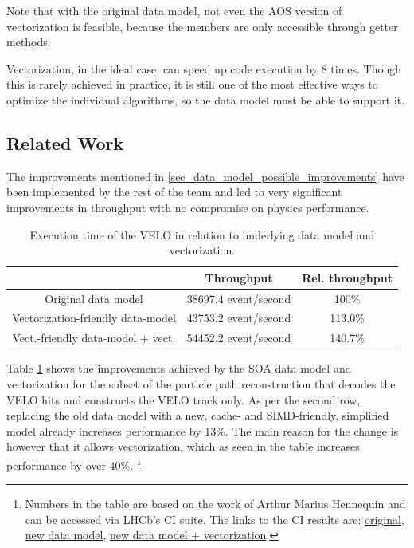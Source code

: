 \documentclass[12pt]{article}
\begin{document}
Note that with the original data model, not even the AOS version of vectorization is feasible, because the members are only accessible through getter methods.

Vectorization, in the ideal case, can speed up code execution by 8 times. Though this is rarely achieved in practice, it is still one of the most effective ways to optimize the individual algorithms, so the data model must be able to support it.


\subsection{Related Work}

The improvements mentioned in \ref{sec_data_model_possible_improvements} have been implemented by the rest of the team and led to very significant improvements in throughput with no compromise on physics performance.

\begin{table}[H]
	\centering
	\begin{tabular}{c | c | c}
		& Throughput & Rel. throughput \\
		\hline
		Original data model & 38697.4 event/second & 100\% \\
		\hline
		Vectorization-friendly data-model & 43753.2 event/second & 113.0\% \\
		\hline
		Vect.-friendly data-model + vect. & 54452.2 event/second & 140.7\%
	\end{tabular}
	\caption[Execution time of the VELO reconstruction algorithms]{Execution time of the 	VELO in relation to underlying data model and vectorization.}
	\label{tbl_datamodel_speedup_simd}
\end{table}

Table \ref{tbl_datamodel_speedup_simd} shows the improvements achieved by the SOA data model and vectorization for the subset of the particle path reconstruction that decodes the VELO hits and constructs the VELO track only. As per the second row, replacing the old data model with a new, cache- and SIMD-friendly, simplified model already increases performance by 13\%. The main reason for the change is however that it allows vectorization, which as seen in the table increases performance by over 40\%.
\footnote{
	Numbers in the table are based on the work of Arthur Marius Hennequin and can be accessed via LHCb's CI suite. The links to the CI results are:
	\href{http://lhcbpr-hlt.web.cern.ch/lhcbpr-hlt/PerfTests/UpgradeThroughput/Throughput_lhcb-head.2269_VeloOnly_x86_64+avx2+fma-centos7-gcc8-opt_2019-06-15_08:35:21_+0200/}{original},
	\href{http://lhcbpr-hlt.web.cern.ch/lhcbpr-hlt/PerfTests/UpgradeThroughput/Throughput_lhcb-head.2270_VeloOnly_x86_64+avx2+fma-centos7-gcc8-opt_2019-06-16_08:37:10_+0200/}{new data model},
	\href{http://lhcbpr-hlt.web.cern.ch/lhcbpr-hlt/PerfTests/UpgradeThroughput/Throughput_lhcb-head.2270_VeloOnlySIMD_x86_64+avx2+fma-centos7-gcc8-opt_2019-06-16_07:03:15_+0200/}{new data model + vectorization}.
} 
\vspace{1pc}
\end{document}
